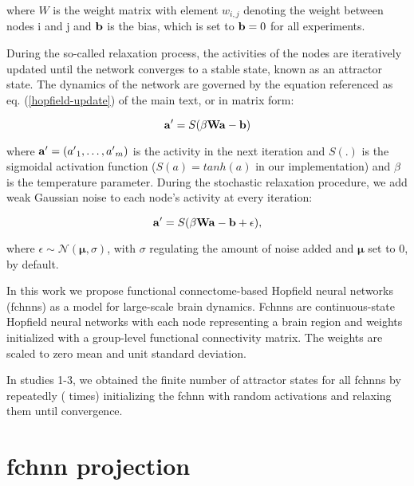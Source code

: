 \documentclass{article}
\begin{document}
where $W$ is the weight matrix with element $w_{i,j}$ denoting the weight between nodes i and j and $\bold{b}$ is the bias, which is set to $\bold{b} = 0$ for all experiments.

During the so-called relaxation process, the activities of the nodes are iteratively updated until the network converges to a stable state, known as an attractor state. The dynamics of the network are governed by the equation referenced as eq. (\ref{hopfield-update}) of the main text, or in matrix form:

\begin{equation}
\label{hopfield-update-matrix}
\bold{a'} = S(\beta \bold{W} \bold{a} - \bold{b})
\end{equation}

where $\bold{a'} = ({a'}_1, \dots, {a'}_m)$ is the activity in the next iteration and $S(.)$ is the sigmoidal activation function ($S(a) = tanh(a)$ in our implementation) and $\beta$ is the temperature parameter.
During the stochastic relaxation procedure, we add weak Gaussian noise to each node's activity at every iteration:

\begin{equation}
\label{hopfield-update-matrix-stochastic}
\bold{a'} = S(\beta \bold{W} \bold{a} - \bold{b}  + \epsilon),
\end{equation}

where $\epsilon \sim \mathcal{N}(\mathbf{\mu}, \sigma)$, with $\sigma$ regulating the amount of noise added and $\mathbf{\mu}$ set to 0, by default.

In this work we propose functional connectome-based Hopfield neural networks (\acrshort{fchnn}s) as a model for large-scale brain dynamics.
Fc\acrshort{hnn}s are continuous-state Hopfield neural networks with each node representing a brain region and weights initialized with a group-level functional connectivity matrix. The weights are scaled to zero mean and unit standard deviation.

In studies 1-3, we obtained the finite number of attractor states for all \acrshort{fchnn}s by repeate\acrshort{dl}y ( times) initializing the \acrshort{fchnn} with random activations and relaxing them until convergence.

\section{\acrshort{fchnn} projection}
\end{document}
